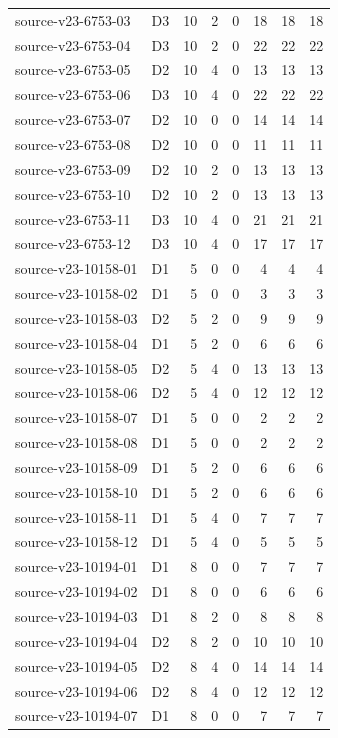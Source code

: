 \begin{longtable}{p{}lrrrrrr}
source-v23-6753-03 & D3 & 10 & 2 & 0 & 18 & 18 & 18\\
source-v23-6753-04 & D3 & 10 & 2 & 0 & 22 & 22 & 22\\
source-v23-6753-05 & D2 & 10 & 4 & 0 & 13 & 13 & 13\\
source-v23-6753-06 & D3 & 10 & 4 & 0 & 22 & 22 & 22\\
source-v23-6753-07 & D2 & 10 & 0 & 0 & 14 & 14 & 14\\
source-v23-6753-08 & D2 & 10 & 0 & 0 & 11 & 11 & 11\\
source-v23-6753-09 & D2 & 10 & 2 & 0 & 13 & 13 & 13\\
source-v23-6753-10 & D2 & 10 & 2 & 0 & 13 & 13 & 13\\
source-v23-6753-11 & D3 & 10 & 4 & 0 & 21 & 21 & 21\\
source-v23-6753-12 & D3 & 10 & 4 & 0 & 17 & 17 & 17\\
source-v23-10158-01 & D1 & 5 & 0 & 0 & 4 & 4 & 4\\
source-v23-10158-02 & D1 & 5 & 0 & 0 & 3 & 3 & 3\\
source-v23-10158-03 & D2 & 5 & 2 & 0 & 9 & 9 & 9\\
source-v23-10158-04 & D1 & 5 & 2 & 0 & 6 & 6 & 6\\
source-v23-10158-05 & D2 & 5 & 4 & 0 & 13 & 13 & 13\\
source-v23-10158-06 & D2 & 5 & 4 & 0 & 12 & 12 & 12\\
source-v23-10158-07 & D1 & 5 & 0 & 0 & 2 & 2 & 2\\
source-v23-10158-08 & D1 & 5 & 0 & 0 & 2 & 2 & 2\\
source-v23-10158-09 & D1 & 5 & 2 & 0 & 6 & 6 & 6\\
source-v23-10158-10 & D1 & 5 & 2 & 0 & 6 & 6 & 6\\
source-v23-10158-11 & D1 & 5 & 4 & 0 & 7 & 7 & 7\\
source-v23-10158-12 & D1 & 5 & 4 & 0 & 5 & 5 & 5\\
source-v23-10194-01 & D1 & 8 & 0 & 0 & 7 & 7 & 7\\
source-v23-10194-02 & D1 & 8 & 0 & 0 & 6 & 6 & 6\\
source-v23-10194-03 & D1 & 8 & 2 & 0 & 8 & 8 & 8\\
source-v23-10194-04 & D2 & 8 & 2 & 0 & 10 & 10 & 10\\
source-v23-10194-05 & D2 & 8 & 4 & 0 & 14 & 14 & 14\\
source-v23-10194-06 & D2 & 8 & 4 & 0 & 12 & 12 & 12\\
source-v23-10194-07 & D1 & 8 & 0 & 0 & 7 & 7 & 7\\

\end{longtable}
